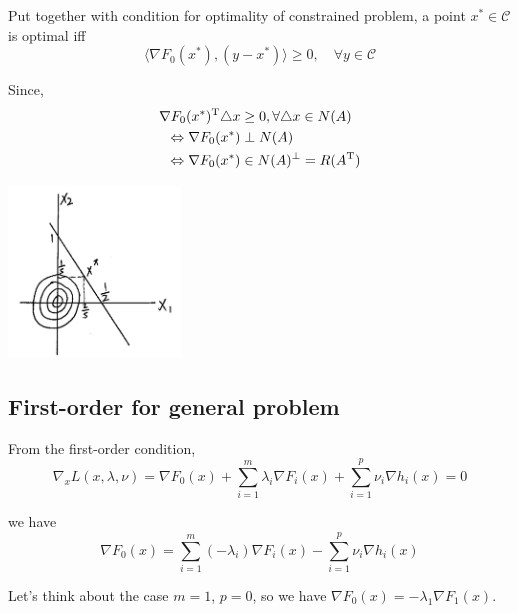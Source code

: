 Put together with condition for optimality of constrained problem, a point $x^*\in\mathcal{C}$ is optimal iff 
$$\langle\nabla F_0(x^*), (y-x^*)\rangle\geq 0,\quad \forall y\in\mathcal{C}$$

Since,
\begin{align*}
\nabla F_0(x^*)^{{\rm T}} \triangle x &\geq 0, \forall \triangle x\in N(A)\\
\Leftrightarrow \nabla F_0(x^*) &\perp N(A)\\
\Leftrightarrow \nabla F_0(x^*) &\in N(A)^{\perp} = R(A^{{\rm T}})
\end{align*}






\begin{marginfigure}
	\centering
	\includegraphics[width=1.8in,height=1.8in]{figures/ch10/figure1204_4.png}
\end{marginfigure}



\subsection{First-order for general problem}
From the first-order condition,
$$\nabla_x L(x,\lambda,\nu) = \nabla F_0(x) + \sum^m_{i=1}\lambda_i\nabla F_i(x) + \sum^p_{i=1}\nu_i \nabla h_i(x) = 0$$

we have
$$\nabla F_0(x) = \sum^m_{i=1}(-\lambda_i)\nabla F_i(x) - \sum^p_{i=1}\nu_i\nabla h_i(x)$$

Let's think about the case $m=1$, $p=0$, so we have $\nabla F_0(x)=-\lambda_1\nabla F_1(x)$.

